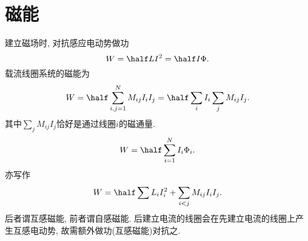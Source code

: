 \documentclass{ctexart}
\begin{document}
\section{磁能} %
\label{sec:磁能}

\headerstamp

建立磁场时, 对抗感应电动势做功
\[ W = \half LI^2 = \half I\Phi. \]
载流线圈系统的磁能为
\[ W = \half\sum_{i,j=1}^N M_{ij} I_i I_j = \half \sum_i I_i \sum_j M_{ij}I_j. \]
其中$\sum_j M_{ij}I_j$恰好是通过线圈$i$的磁通量.
\[ W = \half \sum_{i=1}^N I_i\Phi_i. \]
亦写作
\[ W = \half \sum L_i I_i^2 + \sum_{i<j} M_{ij}I_i I_j. \]
后者谓互感磁能, 前者谓自感磁能. 后建立电流的线圈会在先建立电流的线圈上产生互感电动势, 故需额外做功(互感磁能)对抗之.

\end{document}
